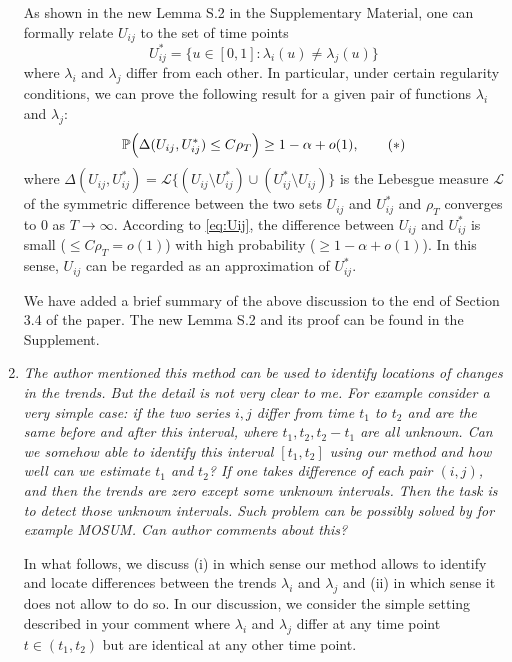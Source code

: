 \documentclass[a4paper,12pt]{article}
\begin{document}
\begin{enumerate}[label=(\arabic*),leftmargin=0.7cm]
As shown in the new Lemma S.2 in the Supplementary Material, one can formally relate $U_{ij}$ to the set of time points 
\[ U_{ij}^* = \{ u \in [0,1]: \lambda_i(u) \ne \lambda_j(u) \} \]
where $\lambda_i$ and $\lambda_j$ differ from each other. In particular, under certain regularity conditions, we can prove the following result for a given pair of functions $\lambda_i$ and $\lambda_j$: 
\begin{equation}\label{eq:Uij}
\mathbb{P}  \Big( \Delta(U_{ij}, U_{ij}^*) \le C \rho_T \Big) \ge 1-\alpha + o(1), \tag{$*$}
\end{equation}
where $\Delta(U_{ij},U_{ij}^*) = \mathcal{L} \{(U_{ij} \setminus U_{ij}^*) \cup (U_{ij}^* \setminus U_{ij})\}$ is the Lebesgue measure $\mathcal{L}$ of the symmetric difference between the two sets $U_{ij}$ and $U_{ij}^*$ and $\rho_T$ converges to $0$ as $T \to \infty$. According to \eqref{eq:Uij}, the difference between $U_{ij}$ and $U_{ij}^*$ is small ($\le C\rho_T = o(1)$) with high probability ($\ge 1 -\alpha + o(1)$). In this sense, $U_{ij}$ can be regarded as an approximation of $U_{ij}^*$. 

We have added a brief summary of the above discussion to the end of Section 3.4 of the paper. The new Lemma S.2 and its proof can be found in the Supplement.


\item \textit{The author mentioned this method can be used to identify locations of changes in the trends. But the detail is not very clear to me. For example consider a very simple case: if the two series $i, j$ differ from time $t_1$ to $t_2$ and are the same before and after this interval, where $t_1, t_2, t_2 - t_1$ are all unknown. Can we somehow able to identify this interval $[t_1, t_2]$ using our method and how well can we estimate $t_1$ and $t_2$? If one takes difference of each pair $(i, j)$, and then the trends are zero except some unknown intervals. Then the task is to detect those unknown intervals. Such problem can be possibly solved by for example MOSUM. Can author comments about this?}

In what follows, we discuss (i) in which sense our method allows to identify and locate differences between the trends $\lambda_i$ and $\lambda_j$ and (ii) in which sense it does not allow to do so. In our discussion, we consider the simple setting described in your comment where $\lambda_i$ and $\lambda_j$ differ at any time point $t \in (t_1,t_2)$ but are identical at any other time point.
\begin{enumerate}[label=(\roman*), leftmargin=0.8cm]


\end{enumerate}
\end{enumerate}
\end{document}
